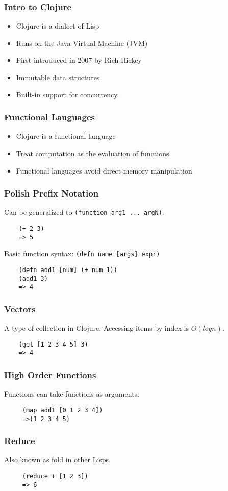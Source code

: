 \documentclass{beamer}
\newcommand{\comment}[1]{{\bf \tt  {#1}}}
\newcommand{\hfcomment}[1]{\textcolor{Teal}{\comment{Henry: {#1}}}}
\newcommand{\clocode}[1]{{\texttt {#1}}}
\begin{document}
\begin{frame}[fragile]
\frametitle{Intro to Clojure}
	\begin{itemize}
  	 \item Clojure is a dialect of Lisp
	\item Runs on the Java Virtual Machine (JVM)
  	 \item First introduced in 2007 by Rich Hickey
  	 \item Immutable data structures
	 \item Built-in support for concurrency.
	 	\end{itemize}
\end{frame}
\begin{frame}[fragile]
\frametitle{Functional Languages}
	\begin{itemize}
	 \item Clojure is a functional language
  	 \item Treat computation as the evaluation of functions
  	 \item Functional languages avoid direct memory manipulation
       \end{itemize}
\end{frame}
\begin{frame}[fragile]
\frametitle{Polish Prefix Notation}
Can be generalized to \clocode{(function arg1 ... argN)}.
	\begin{verbatim}
	(+ 2 3)
	=> 5
	\end{verbatim}
Basic function syntax: \clocode{(defn name [args] expr)}
	\begin{verbatim}
	(defn add1 [num] (+ num 1))
	(add1 3)
	=> 4
	\end{verbatim}
\end{frame}
\begin{frame}[fragile]
\frametitle{Vectors}

A type of collection in Clojure.
Accessing items by index is $O(log n)$.
	\begin{verbatim}
	(get [1 2 3 4 5] 3)	
	=> 4
	\end{verbatim}
\end{frame}
\begin{frame}[fragile]
\frametitle{High Order Functions}
 Functions can take functions as arguments.
	\begin{verbatim}
	 (map add1 [0 1 2 3 4])
	 =>(1 2 3 4 5)
	\end{verbatim}
\end{frame}
\begin{frame}[fragile]
\frametitle{Reduce}
Also known as fold in other Lisps.
	\begin{verbatim}
	 (reduce + [1 2 3])
	 => 6
	\end{verbatim}
\end{frame}
\end{document}
